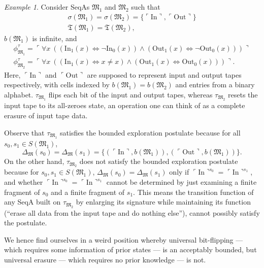 \documentclass[12pt, twoside]{memoir}
\numberwithin{equation}{section}
\theoremstyle{definition}
\theoremstyle{remark}
\newtheorem{ex}[thm]{Example}
\theoremstyle{definition}
\theoremstyle{definition}
\theoremstyle{definition}
\theoremstyle{remark}
\begin{document}
\begin{ex}\label{ex218}
Consider SeqAs $\mathfrak{M}_1$ and $\mathfrak{M}_2$ such that 
\begin{gather*}
    \sigma(\mathfrak{M}_1) = \sigma(\mathfrak{M}_2) = \{\ulcorner \mathrm{In} \urcorner, \ulcorner \mathrm{Out} \urcorner\} \\
    \mathfrak{T}(\mathfrak{M}_1) = \mathfrak{T}(\mathfrak{M}_2) \text{,}
\end{gather*}
$b(\mathfrak{M}_1)$ is infinite, and
\begin{gather*}
    \phi^{\tau}_{\mathfrak{M}_1} = \ulcorner \forall x \ ((\mathrm{In}_1(x) \iff \neg \mathrm{In}_0(x)) \wedge (\mathrm{Out}_1(x) \iff \neg \mathrm{Out}_0(x))) \urcorner \\
    \phi^{\tau}_{\mathfrak{M}_2} = \ulcorner \forall x \ ((\mathrm{In}_1(x) \iff x \neq x) \wedge (\mathrm{Out}_1(x) \iff \mathrm{Out}_0(x))) \urcorner \text{.}
\end{gather*}
Here, $\ulcorner \mathrm{In} \urcorner$ and $\ulcorner \mathrm{Out} \urcorner$ are supposed to represent input and output tapes respectively, with cells indexed by $b(\mathfrak{M}_1) = b(\mathfrak{M}_2)$ and entries from a binary alphabet. $\tau_{\mathfrak{M}_1}$ flips each bit of the input and output tapes, whereas $\tau_{\mathfrak{M}_2}$ resets the input tape to its all-zeroes state, an operation one can think of as a complete erasure of input tape data.

Observe that $\tau_{\mathfrak{M}_1}$ satisfies the bounded exploration postulate because for all $s_0, s_1 \in S(\mathfrak{M}_1)$, 
\begin{equation*}
    \Delta_{\mathfrak{M}}(s_0) = \Delta_{\mathfrak{M}}(s_1) = \{(\ulcorner \mathrm{In} \urcorner, b(\mathfrak{M}_1)), (\ulcorner \mathrm{Out} \urcorner, b(\mathfrak{M}_1))\} \text{.}
\end{equation*}
On the other hand, $\tau_{\mathfrak{M}_2}$ does not satisfy the bounded exploration postulate because for $s_0, s_1 \in S(\mathfrak{M}_1)$, $\Delta_{\mathfrak{M}}(s_0) = \Delta_{\mathfrak{M}}(s_1)$ only if $\ulcorner \mathrm{In} \urcorner^{s_0} = \ulcorner \mathrm{In} \urcorner^{s_1}$, and whether $\ulcorner \mathrm{In} \urcorner^{s_0} = \ulcorner \mathrm{In} \urcorner^{s_1}$ cannot be determined by just examining a finite fragment of $s_0$ and a finite fragment of $s_1$. This means the transition function of any SeqA built on $\tau_{\mathfrak{M}_2}$ by enlarging its signature while maintaining its function (``erase all data from the input tape and do nothing else''), cannot possibly satisfy the postulate.

We hence find ourselves in a weird position whereby universal bit-flipping --- which requires some information of prior states --- is an acceptably bounded, but universal erasure --- which requires no prior knowledge --- is not.
\end{ex}
\end{document}

